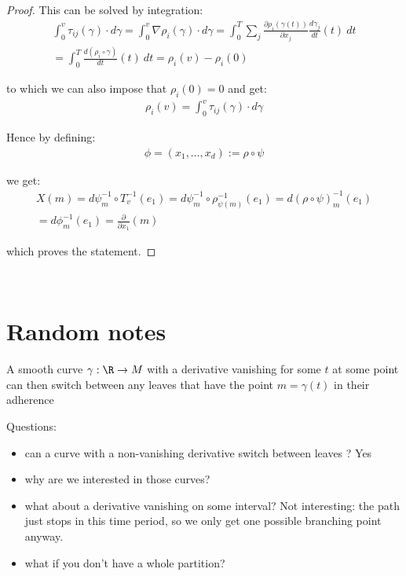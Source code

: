 \begin{proof}
                This can be solved by integration:
                \begin{gather*}
                    \int_{0}^{v} \tau_{ij}(\gamma) \cdot d \gamma = \int_{0}^{v} \nabla \rho_i(\gamma) \cdot d \gamma = \int_0^T \sum_j \frac{\partial \rho_i(\gamma(t))}{\partial x_j} \frac{d \gamma_j}{dt}(t) \: dt \\
                    = \int_0^T \frac{d(\rho_i \circ \gamma)}{dt}(t) \: dt = \rho_i(v) - \rho_i(0)
                \end{gather*}
    
                to which we can also impose that $\rho_i(0) = 0$ and get:
                \begin{align*}
                    \rho_i(v) = \int_{0}^{v} \tau_{ij}(\gamma) \cdot d \gamma
                \end{align*}
    
                Hence by defining:
                \begin{align*}
                    \phi = (x_1, \ldots, x_d) := \rho \circ \psi
                \end{align*}
    
                we get:
                \begin{gather*}
                    X(m) = d \psi_m^{-1} \circ T_v^{-1}(e_1) = d \psi_m^{-1} \circ \rho_{\psi(m)}^{-1}(e_1) = d(\rho \circ \psi)_m^{-1}(e_1) \\
                    = d \phi^{-1}_m(e_1) = \frac{\partial}{\partial x_1}(m)
                \end{gather*}
    
                which proves the statement.
        \end{proof}

\newpage
~
\newpage

\section{Random notes}

	A smooth curve $\gamma: \R \to M$ with a derivative vanishing for some $t$ at some point can then switch between any leaves that have the point $m = \gamma(t)$ in their adherence

	Questions:
	\begin{itemize}
		\item can a curve with a non-vanishing derivative switch between leaves ? Yes
		\item why are we interested in those curves?
		\item what about a derivative vanishing on some interval? Not interesting: the path just stops in this time period, so we only get one possible branching point anyway.
		\item what if you don't have a whole partition?
	\end{itemize}


